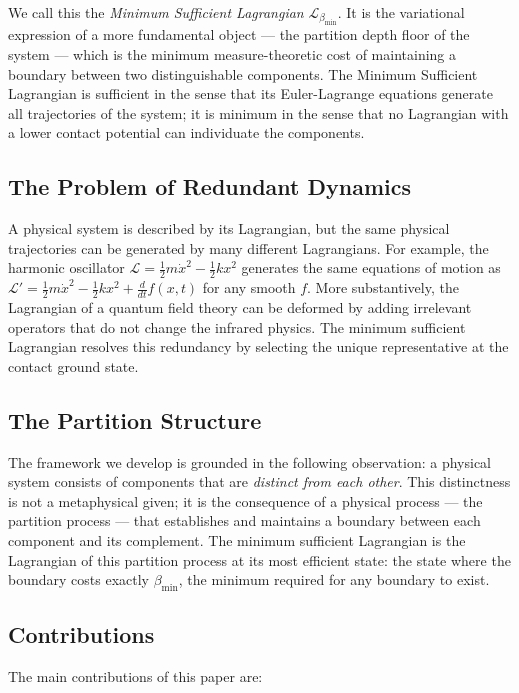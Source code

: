 \documentclass[11pt,twocolumn,a4paper]{article}
\theoremstyle{plain}
\theoremstyle{definition}
\theoremstyle{remark}
\newcommand{\bmin}{\beta_{\min}}
\newcommand{\Lmin}{\mathcal{L}_{\bmin}}
\newcommand{\half}{\tfrac{1}{2}}
\begin{document}
We call this the \emph{Minimum Sufficient Lagrangian} $\Lmin$. It is the
variational expression of a more fundamental object --- the partition depth
floor of the system --- which is the minimum measure-theoretic cost of
maintaining a boundary between two distinguishable components. The Minimum
Sufficient Lagrangian is sufficient in the sense that its Euler-Lagrange
equations generate all trajectories of the system; it is minimum in the sense
that no Lagrangian with a lower contact potential can individuate the components.

\subsection{The Problem of Redundant Dynamics}

A physical system is described by its Lagrangian, but the same physical
trajectories can be generated by many different Lagrangians. For example, the
harmonic oscillator $\mathcal{L} = \half m\dot{x}^2 - \half kx^2$ generates
the same equations of motion as $\mathcal{L}' = \half m\dot{x}^2 - \half kx^2
+ \frac{d}{dt}f(x,t)$ for any smooth $f$. More substantively, the Lagrangian of
a quantum field theory can be deformed by adding irrelevant operators that do not
change the infrared physics. The minimum sufficient Lagrangian resolves this
redundancy by selecting the unique representative at the contact ground state.

\subsection{The Partition Structure}

The framework we develop is grounded in the following observation: a physical
system consists of components that are \emph{distinct from each other}. This
distinctness is not a metaphysical given; it is the consequence of a physical
process --- the partition process --- that establishes and maintains a boundary
between each component and its complement. The minimum sufficient Lagrangian is
the Lagrangian of this partition process at its most efficient state: the state
where the boundary costs exactly $\bmin$, the minimum required for any boundary
to exist.

\subsection{Contributions}

The main contributions of this paper are:
\end{document}
